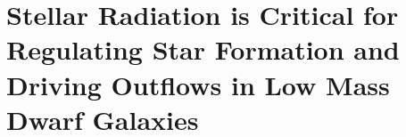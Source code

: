 \chapter[Stellar Radiation is Critical for Regulating Star Formation and Driving Outflows in Low Mass Dwarf Galaxies]{Stellar Radiation is Critical for Regulating Star Formation and Driving Outflows in Low Mass Dwarf Galaxies \label{ch:chapter2}}
\let\thefootnote\relax{}

%
%
%

